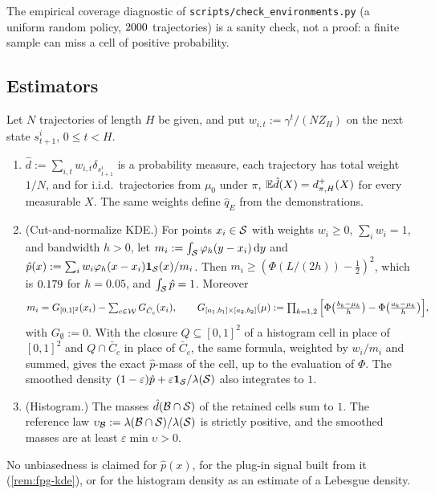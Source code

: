 \noindent The empirical coverage diagnostic of \texttt{scripts/check\_environments.py} (a uniform random policy, $\vn{env.unif_traj}{2000}$ trajectories) is a sanity check, not a proof: a finite sample can miss a cell of positive probability.

\subsection{Estimators}\label{sec:env-estimators}

\begin{proposition}\label{prop:env-est}
Let $N$ trajectories of length $H$ be given, and put $w_{i,t}:=\gamma^t/(NZ_H)$ on the next state $s^i_{t+1}$, $0\le t<H$.
\begin{enumerate}[nosep,label=(\alph*)]
\item $\hat d:=\sum_{i,t}w_{i,t}\delta_{s^i_{t+1}}$ is a probability measure, each trajectory has total weight $1/N$, and for i.i.d.\ trajectories from $\mu_0$ under $\pi$, $\E\hat d(X)=d^+_{\pi,H}(X)$ for every measurable $X$. The same weights define $\hat q_E$ from the demonstrations.
\item (Cut-and-normalize KDE.) For points $x_i\in\cS$ with weights $w_i\ge0$, $\sum_iw_i=1$, and bandwidth $h>0$, let $m_i:=\int_\cS\varphi_h(y-x_i)\dd y$ and $\hat p(x):=\sum_iw_i\varphi_h(x-x_i)\ind_\cS(x)/m_i$. Then $m_i\ge(\Phi(L/(2h))-\frac12)^2$, which is $\vn{const.kde_m_star}{0.179}$ for $h=0.05$, and $\int_\cS\hat p=1$. Moreover
  \[
  m_i=G_{[0,1]^2}(x_i)-\textstyle\sum_{c\in\cW}G_{\bar C_c}(x_i),\qquad G_{[a_1,b_1]\times[a_2,b_2]}(\mu):=\prod_{k=1,2}\Big[\Phi\big(\tfrac{b_k-\mu_k}h\big)-\Phi\big(\tfrac{a_k-\mu_k}h\big)\Big],
  \]
  with $G_\emptyset:=0$. With the closure $Q\subseteq[0,1]^2$ of a histogram cell in place of $[0,1]^2$ and $Q\cap\bar C_c$ in place of $\bar C_c$, the same formula, weighted by $w_i/m_i$ and summed, gives the exact $\hat p$-mass of the cell, up to the evaluation of $\Phi$. The smoothed density $(1-\varepsilon)\hat p+\varepsilon\ind_\cS/\Leb(\cS)$ also integrates to $1$.
\item (Histogram.) The masses $\hat d(\cB\cap\cS)$ of the retained cells sum to $1$. The reference law $\upsilon_\cB:=\Leb(\cB\cap\cS)/\Leb(\cS)$ is strictly positive, and the smoothed masses are at least $\varepsilon\min\upsilon>0$.
\end{enumerate}
No unbiasedness is claimed for $\hat p(x)$, for the plug-in signal built from it (\cref{rem:fpg-kde}), or for the histogram density as an estimate of a Lebesgue density.
\end{proposition}
